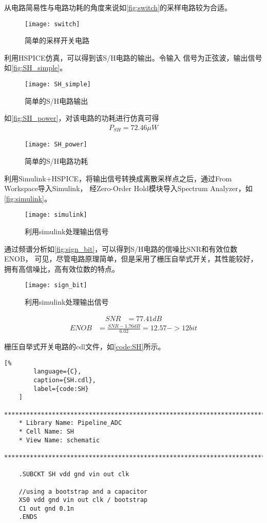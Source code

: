     \par 从电路简易性与电路功耗的角度来说如\autoref{fig:switch}的采样电路较为合适。
    \begin{figure}[H]
        \centering
        \texttt{[image: switch]}
        \caption{\label{fig:switch}简单的采样开关电路}
    \end{figure}
    \par 利用HSPICE仿真，可以得到该S/H电路的输出。令输入
    信号为正弦波，输出信号如\autoref{fig:SH_simple}。
    \begin{figure}[H]
        \centering
        \texttt{[image: SH\_simple]}
        \caption{\label{fig:SH_simple}简单的S/H电路输出}
    \end{figure}
    \par 如\autoref{fig:SH_power}，对该电路的功耗进行仿真可得
    \begin{align}
        P_{SH} = 72.46\mu W
    \end{align}
    \begin{figure}[H]
        \centering
        \texttt{[image: SH\_power]}
        \caption{\label{fig:SH_power}简单的S/H电路功耗}
    \end{figure}
    \par 利用Simulink+HSPICE，将输出信号转换成离散采样点之后，通过From Workspace导入Simulink，
    经Zero-Order Hold模块导入Spectrum Analyzer，如\autoref{fig:simulink}。
    \begin{figure}[H]
        \centering
        \texttt{[image: simulink]}
        \caption{\label{fig:simulink}利用simulink处理输出信号}
    \end{figure}
    \par 通过频谱分析如\autoref{fig:sign_bit}，可以得到S/H电路的信噪比SNR和有效位数ENOB，
    可见，尽管电路原理简单，但是采用了栅压自举式开关，其性能较好，拥有高信噪比，高有效位数的特点。
    \begin{figure}[H]
        \centering
        \texttt{[image: sign\_bit]}
        \caption{\label{fig:sign_bit}利用simulink处理输出信号}
    \end{figure}
    \begin{align}
        SNR & = 77.41dB
    \end{align}
    \begin{align}
        ENOB & = \frac{SNR - 1.76dB}{6.02}  = 12.57 -> 12bit
    \end{align}

    \par 栅压自举式开关电路的cdl文件，如\autoref{code:SH}所示。
    \begin{lstlisting}[%
        language={C},
        caption={SH.cdl},
        label={code:SH}
    ]
    ********************************************************************************
    * Library Name: Pipeline_ADC
    * Cell Name: SH
    * View Name: schematic
    ********************************************************************************

    .SUBCKT SH vdd gnd vin out clk

    //using a bootstrap and a capacitor
    XS0 vdd gnd vin out clk / bootstrap
    C1 out gnd 0.1n
    .ENDS
    \end{lstlisting}

